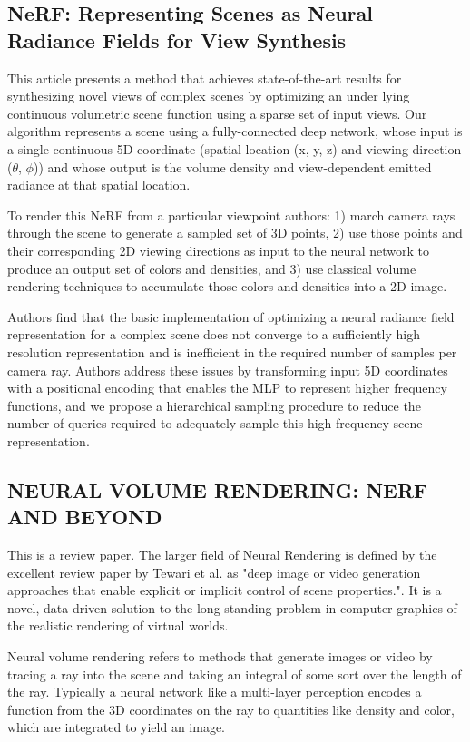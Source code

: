 \documentclass[UTF-8]{ctexart}
\begin{document}
\subsection{NeRF: Representing Scenes as Neural Radiance Fields for View Synthesis}
This article presents a method that achieves state-of-the-art results for synthesizing novel views of complex scenes by optimizing an under lying continuous volumetric scene function using a sparse set of input views. Our algorithm represents a scene using a fully-connected deep network, whose input is a single continuous 5D coordinate (spatial location (x, y, z) and viewing direction ($\theta$, $\phi$)) and whose output is the volume density and view-dependent emitted radiance at that spatial location.\par

To render this NeRF from a particular viewpoint authors: 1) march camera rays through the scene to generate a sampled set of 3D points, 2) use those points and their corresponding 2D viewing directions as input to the neural network to produce an output set of colors and densities, and 3) use classical volume rendering techniques to accumulate those colors and densities into a 2D image.\par

Authors find that the basic implementation of optimizing a neural radiance field representation for a complex scene does not converge to a sufficiently high resolution representation and is inefficient in the required number of samples per camera ray. Authors address these issues by transforming input 5D coordinates with a positional encoding that enables the MLP to represent higher frequency functions, and we propose a hierarchical sampling procedure to reduce the number of queries required to adequately sample this high-frequency scene representation.

\subsection{NEURAL VOLUME RENDERING: NERF AND BEYOND}
This is a review paper. The larger field of Neural Rendering is defined by the excellent review paper by Tewari et al. as "deep image or video generation approaches that enable explicit or implicit control of scene properties.". It is a novel, data-driven solution to the long-standing problem in computer graphics of the realistic rendering of virtual worlds.\par

Neural volume rendering refers to methods that generate images or video by tracing a ray into the scene and taking an integral of some sort over the length of the ray. Typically a neural network like a multi-layer perception encodes a function from the 3D coordinates on the ray to quantities like density and color, which are integrated to yield an image.\par
\end{document}
